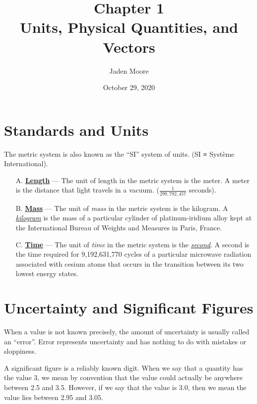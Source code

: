 \documentclass[12pt]{article}
\title{
    Chapter 1 \\
    Units, Physical Quantities, and Vectors
    }
\author{Jaden Moore}
\date{October 29, 2020}
\begin{document}

\maketitle

\pagestyle{fancy}
\fancyhf{}
\setlength{\headheight}{15pt}
\cfoot{\thepage}

\section{Standards and Units}
The metric system is also known as the “SI” system
of units. (SI ≡ Système International).

\begin{itemize}
    \item[A.] \textbf{\underline{Length}} — The unit of length in the metric system is the meter.
          A meter is the distance that light travels in a vacuum.
          ($\frac{1}{299,792,457}$ seconds).

    \item[B.] \textbf{\underline{Mass}} — The unit of \textit{mass} in the metric system is the kilogram.
          A \textit{\underline{kilogram}} is the mass of a particular cylinder of
          platinum-iridium alloy kept at the International Bureau of
          Weights and Measures in Paris, France.

    \item[C.] \textbf{\underline{Time}} — The unit of \textit{time} in the metric system is the \textit{\underline{second}}. A
          second is the time required for 9,192,631,770 cycles of a particular microwave radiation associated with cesium
          atoms that occurs in the transition between its two lowest
          energy states.
\end{itemize}

\section{Uncertainty and Significant Figures}
When a value is not known precisely, the amount of
uncertainty is usually called an “error”. Error represents
uncertainty and has nothing to do with mistakes or
sloppiness.

A significant figure is a reliably known digit. When we
say that a quantity has the value 3, we mean by
convention that the value could actually be anywhere
between 2.5 and 3.5. However, if we say that the value is
3.0, then we mean the value lies between 2.95 and 3.05.
\end{document}
